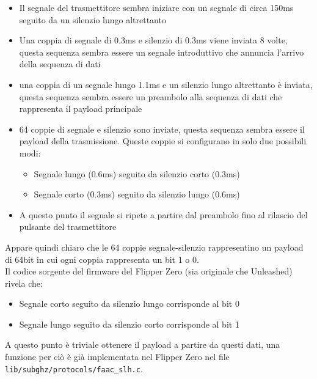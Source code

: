 \begin{itemize}
  \item Il segnale del trasmettitore sembra iniziare con un segnale di circa 150ms seguito da un silenzio lungo altrettanto
  \item Una coppia di segnale di 0.3ms e silenzio di 0.3ms viene inviata 8 volte, questa sequenza sembra essere un segnale introduttivo che annuncia l’arrivo della sequenza di dati
  \item una coppia di un segnale lungo 1.1ms e un silenzio lungo altrettanto è inviata, questa sequenza sembra essere un preambolo alla sequenza di dati che rappresenta il payload principale
  \item 64 coppie di segnale e silenzio sono inviate, questa sequenza sembra essere il payload della trasmissione. Queste coppie si configurano in solo due possibili modi:
    \begin{itemize}
      \item Segnale lungo (0.6ms) seguito da silenzio corto (0.3ms)
      \item Segnale corto (0.3ms) seguito da silenzio lungo (0.6ms)
    \end{itemize}
  \item A questo punto il segnale si ripete a partire dal preambolo fino al rilascio del pulsante del trasmettitore
\end{itemize}
Appare quindi chiaro che le 64 coppie segnale-silenzio rappresentino un payload di 64bit in cui ogni coppia rappresenta un bit 1 o 0.\\
Il codice sorgente del firmware del Flipper Zero (sia originale che Unleashed) rivela che:
\begin{itemize}
  \item Segnale corto seguito da silenzio lungo corrisponde al bit 0
  \item Segnale lungo seguito da silenzio corto corrisponde al bit 1
\end{itemize}
A questo punto è triviale ottenere il payload a partire da questi dati, una funzione per ciò è già implementata nel Flipper Zero nel file \texttt{lib/subghz/protocols/faac\_slh.c}\cite{firmware}.

